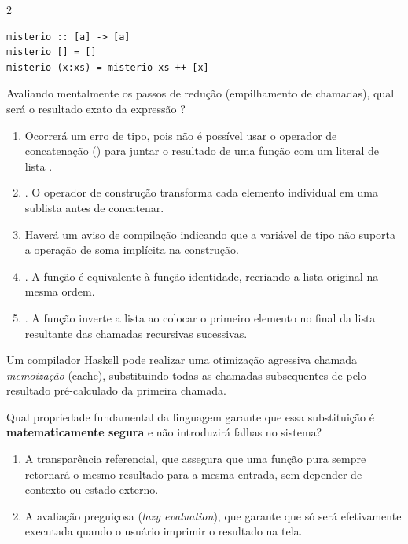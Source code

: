 \documentclass[a4paper,10pt,brazil]{article}
\begin{document}
\begin{multicols}{2}
\begin{verbatim}
misterio :: [a] -> [a]
misterio [] = []
misterio (x:xs) = misterio xs ++ [x]
\end{verbatim}

Avaliando mentalmente os passos de redução (empilhamento de chamadas), qual será o resultado exato da expressão ?

\begin{enumerate}
  \item Ocorrerá um erro de tipo, pois não é possível usar o operador de concatenação (\haskellinline{++}) para juntar o resultado de uma função com um literal de lista \haskellinline{[x]}.

  \item \haskellinline{[[1], [2], [3]]}. O operador de construção transforma cada elemento individual em uma sublista antes de concatenar.

  \item Haverá um aviso de compilação indicando que a variável de tipo  não suporta a operação de soma implícita na construção.

  \item \haskellinline{[1, 2, 3]}. A função é equivalente à função identidade, recriando a lista original na mesma ordem.

  \item \haskellinline{[3, 2, 1]}. A função inverte a lista ao colocar o primeiro elemento no final da lista resultante das chamadas recursivas sucessivas.


\end{enumerate}

Um compilador Haskell pode realizar uma otimização agressiva chamada \emph{memoização} (cache), substituindo todas as chamadas subsequentes de  pelo resultado pré-calculado da primeira chamada. 

Qual propriedade fundamental da linguagem garante que essa substituição é \textbf{matematicamente segura} e não introduzirá falhas no sistema?

\begin{enumerate}
  \item A transparência referencial, que assegura que uma função pura sempre retornará o mesmo resultado para a mesma entrada, sem depender de contexto ou estado externo.

  \item A avaliação preguiçosa (\emph{lazy evaluation}), que garante que  só será efetivamente executada quando o usuário imprimir o resultado na tela.


\end{enumerate}
\end{multicols}
\end{document}
